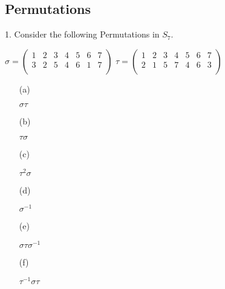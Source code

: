 \subsection{Permutations} %
\begin{mdframed}[style=darkQuesion]
  1. Consider the following Permutations in $S_7$.
  \begin{multicols}{2}
    $\sigma=  
    \begin{pmatrix}
      1 & 2 & 3 & 4 & 5 & 6 & 7\\
      3 & 2 & 5 & 4 & 6 & 1 & 7\\
    \end{pmatrix}$
    $\tau=  
    \begin{pmatrix}
      1 & 2 & 3 & 4 & 5 & 6 & 7\\
      2 & 1 & 5 & 7 & 4 & 6 & 3\\
    \end{pmatrix}$
  \end{multicols}
  \vspace{.25in}
  \begin{itemize}
    \item [(a)]{$\sigma\tau$
      
    }
    \item [(b)]{$\tau\sigma$

    }
    \item [(c)]{$\tau^2\sigma$

    }
    \item [(d)]{$\sigma^{-1}$

    }
    \item [(e)]{$\sigma\tau\sigma^{-1}$

    }
    \item [(f)]{$\tau^{-1}\sigma\tau$

    }
  \end{itemize}
\end{mdframed}
  

